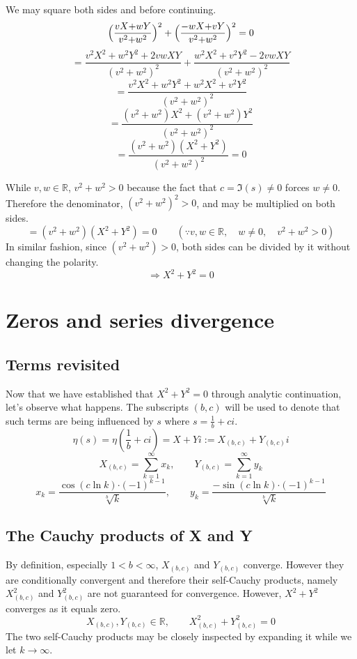 \documentclass{amsart}
\begin{document}
	We may square both sides and before continuing.
	\[ \Bigl(\frac{vX{+}wY}{v^2{+}w^2}\Bigr)^2 + \Bigl(\frac{-wX{+}vY}{v^2{+}w^2}\Bigr)^2 = 0 \]
	\[ = \frac{v^2X^2 + w^2Y^2 + 2vwXY}{(v^2+w^2)^2} + \frac{w^2X^2 + v^2Y^2 - 2vwXY}{(v^2+w^2)^2} \]
	\[ = \frac{v^2X^2 + w^2Y^2 + w^2X^2 + v^2Y^2}{(v^2+w^2)^2} \]
	\[ = \frac{(v^2+w^2)X^2 + (v^2+w^2)Y^2}{(v^2+w^2)^2} \]
	\[ = \frac{(v^2+w^2)(X^2 + Y^2)}{(v^2+w^2)^2} = 0 \]
	
	
	While $v,w \in \mathbb{R}$, $v^2+w^2 > 0$ because the fact that $c = \Im(s) \neq 0$ forces $w \neq 0$. Therefore the denominator, $(v^2+w^2)^2 > 0$, and may be multiplied on both sides.
	\[ = (v^2+w^2)(X^2 + Y^2) = 0 \qquad (\because v, w \in \mathbb{R}, \quad w \neq 0, \quad v^2 + w^2 > 0)  \]
	In similar fashion, since $(v^2+w^2)>0$, both sides can be divided by it without changing the polarity.
	\[ \Rightarrow X^2 + Y^2 = 0 \]
	\[  \]
	\section{Zeros and series divergence}
	\subsection{Terms revisited}
	Now that we have established that $X^2+Y^2 = 0$ through analytic continuation, let's observe what happens. The subscripts $(b,c)$ will be used to denote that such terms are being influenced by $s$ where $s=\frac{1}{b}+ci$.
	\[ \eta(s) = \eta(\frac{1}{b}+ci) = X+Yi := X_{(b,c)} + Y_{(b,c)}i \]
	\[ X_{(b,c)} = \sum\limits_{k=1}^{\infty}x_k, \qquad Y_{(b,c)} = \sum\limits_{k=1}^{\infty}y_k \]
	\[ x_k = \frac{\cos({c\ln k}){\cdot({-}1)^{k-1}}}{\sqrt[b]{k}}, \qquad y_k = \frac{-\sin({c\ln k}){\cdot({-}1)^{k-1}}}{\sqrt[b]{k}} \]
	
	
	
	\subsection{The Cauchy products of X and Y}
	By definition, especially $1<b<\infty$, $X_{(b,c)}$ and $Y_{(b,c)}$ converge. However they are conditionally convergent and therefore their self-Cauchy products, namely $X_{(b,c)}^2$ and $Y_{(b,c)}^2$ are not guaranteed for convergence. However, $X^2+Y^2$ converges as it equals zero.
	\[ X_{(b,c)}, Y_{(b,c)} \in \mathbb{R}, \qquad X_{(b,c)}^2+Y_{(b,c)}^2 = 0 \]
	The two self-Cauchy products may be closely inspected by expanding it while we let $k \to \infty$.
	
\end{document}
